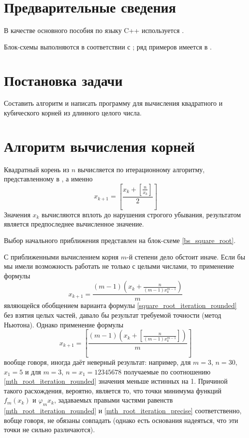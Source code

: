 \documentclass[a4paper,12pt]{article} %
\begin{document}
\setcounter{page}{2}

\section*{Предварительные сведения}

В качестве основного пособия по языку C++ используется \cite{chmyhalo}.


Блок-схемы выполняются в соответствии с \cite{gost-block-scheme};
ряд примеров имеется в \cite{wiki-block-scheme}.


\section*{Постановка задачи}
Составить алгоритм и написать программу
для вычисления квадратного и кубического корней из длинного целого числа.


\section*{Алгоритм вычисления корней}

Квадратный корень из $n$ вычисляется по итерационному алгоритму,
представленному в \cite{Glukhov}, а именно
\begin{equation}\label{square_root_iteration_rounded}
	x_{k+1} = \left[
		\frac{
			x_k+\left[\frac{n}{x_k}\right]
		}{2}
	\right]
\end{equation}
Значения $x_k$ вычисляются вплоть до нарушения строгого убывания,
результатом является предпоследнее вычисленное значение.

Выбор начального приближения представлен на блок-схеме \ref{bs_square_root}.

С приближенными вычислением корня $m$-й степени дело обстоит иначе.
Если бы мы имели возможность работать не только с целыми числами,
то применение формулы
\begin{equation}\label{mth_root_iteration_precise}
	x_{k+1} =
		\frac{(m-1)\left(
			x_k+\frac{n}{(m-1)x_k^{m-1}}
		\right)
		}{m}
\end{equation}
являющейся обобщением варианта формулы \eqref{square_root_iteration_rounded} без взятия целых частей,
давало бы результат требуемой точности (метод Ньютона).
Однако применение формулы
\begin{equation}\label{mth_root_iteration_rounded}
	x_{k+1} = \left[
		\frac{(m-1)\left(
			x_k+\left[\frac{n}{(m-1)x_k^{m-1}}\right]
		\right)
		}{m}
	\right]
\end{equation}
вообще говоря, иногда даёт неверный результат: например,
для $m=3$, $n=30$, $x_1=5$ и для $m=3$, $n=x_1=12345678$
получаемые по соотношению \eqref{mth_root_iteration_rounded}
значения меньше истинных на 1.
Причиной такого расхождения, вероятно, является то, что точки минимума функций
$f_m(x_k)$ и $\varphi_m{x_k}$,
задаваемых правыми частями равенств \eqref{mth_root_iteration_rounded} и \eqref{mth_root_iteration_precise}
соответственно, вобще говоря, не обязаны совпадать
(однако есть основания надеяться, что эти точки не сильно различаются).
\end{document}
